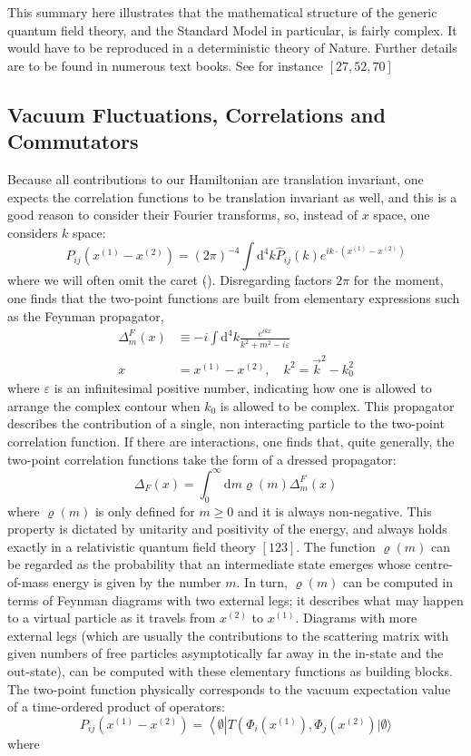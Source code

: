 \documentclass[main.tex]{subfiles}
\begin{document}
This summary here illustrates that the mathematical structure of the generic quantum field theory, and the Standard Model in particular, is fairly complex. It would have to be reproduced in a deterministic theory of Nature. Further details are to be found in numerous text books. See for instance $[27,52,70]$

\subsection{Vacuum Fluctuations, Correlations and Commutators}\label{ch20.6}

Because all contributions to our Hamiltonian are translation invariant, one expects the correlation functions to be translation invariant as well, and this is a good reason to consider their Fourier transforms, so, instead of $x$ space, one considers $k$ space:
$$
P_{i j}\left(x^{(1)}-x^{(2)}\right)=(2 \pi)^{-4} \int \mathrm{d}^{4} k \hat{P}_{i j}(k) e^{i k \cdot\left(x^{(1)}-x^{(2)}\right)}
$$
where we will often omit the caret ($\hat{ }$). Disregarding factors $2 \pi$ for the moment, one finds that the two-point functions are built from elementary expressions such as the Feynman propagator,
$$
\begin{aligned}
\Delta_{m}^{F}(x) & \equiv-i \int \mathrm{d}^{4} k \frac{e^{i k x}}{k^{2}+m^{2}-i \varepsilon} \\
x &=x^{(1)}-x^{(2)}, \quad k^{2}=\vec{k}^{2}-k_{0}^{2}
\end{aligned}
$$
where $\varepsilon$ is an infinitesimal positive number, indicating how one is allowed to arrange the complex contour when $k_{0}$ is allowed to be complex. This propagator describes the contribution of a single, non interacting particle to the two-point correlation function. If there are interactions, one finds that, quite generally, the two-point correlation functions take the form of a dressed propagator:
$$
\Delta_{F}(x)=\int_{0}^{\infty} \mathrm{d} m \varrho(m) \Delta_{m}^{F}(x)
$$
where $\varrho(m)$ is only defined for $m \geq 0$ and it is always non-negative. This property is dictated by unitarity and positivity of the energy, and always holds exactly in a relativistic quantum field theory $[123] .$ The function $\varrho(m)$ can be regarded as the probability that an intermediate state emerges whose centre-of-mass energy is given by the number $m .$ In turn, $\varrho(m)$ can be computed in terms of Feynman diagrams with two external legs; it describes what may happen to a virtual particle as it travels from $x^{(2)}$ to $x^{(1)} .$ Diagrams with more external legs (which are usually the contributions to the scattering matrix with given numbers of free particles asymptotically far away in the in-state and the out-state), can be computed with these elementary functions
as building blocks. The two-point function physically corresponds to the vacuum expectation value of a time-ordered product of operators:
$$
P_{i j}\left(x^{(1)}-x^{(2)}\right)=\left\langle\emptyset\left|T\left(\Phi_{i}\left(x^{(1)}\right), \Phi_{j}\left(x^{(2)}\right)|\emptyset\rangle\right.\right.\right.
$$
where
\end{document}
